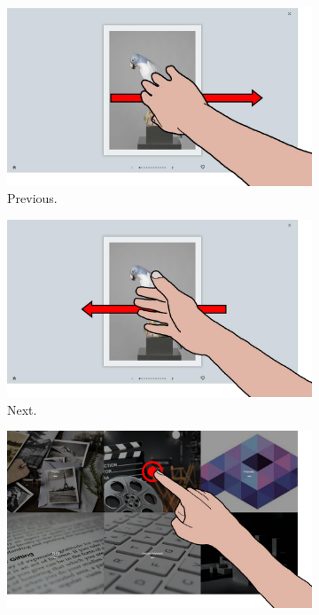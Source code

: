 \begin{figure}[ht]
    \begin{subfigure}{.24\textwidth}
        \centering
        \includegraphics[width=.97\linewidth]{Figures/LUI/Gestures/flick_right.pdf}  
        \vspace{-6pt}
        \captionsetup{width=.9\linewidth}
        \caption{Previous.}
        \label{fig:lui:gestures:previous}
    \end{subfigure}
    \begin{subfigure}{.24\textwidth}
        \centering
        \includegraphics[width=.97\linewidth]{Figures/LUI/Gestures/flick_left.pdf}  
        \vspace{-6pt}
        \captionsetup{width=.9\linewidth}
        \caption{Next.}
        \label{fig:lui:gestures:next}
    \end{subfigure}
    \begin{subfigure}{.24\textwidth}
        \centering
        \includegraphics[width=.97\linewidth]{Figures/LUI/Gestures/tap-open.pdf} 

\end{subfigure}
\end{figure}
